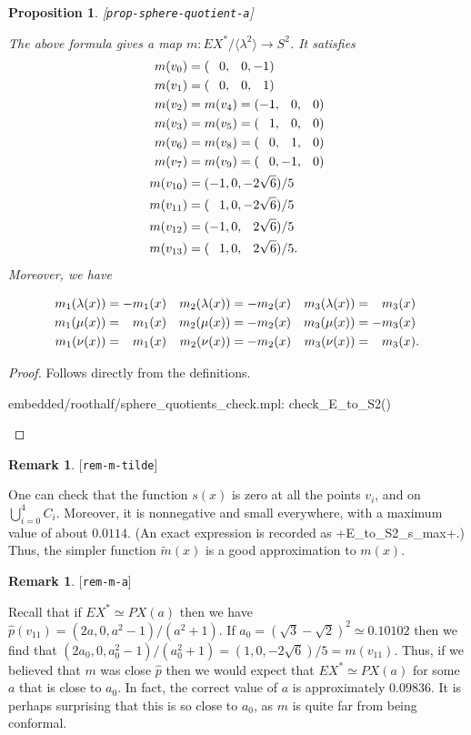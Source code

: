 \documentclass[reqno]{amsart}
\newcommand{\lbl}[1]{\label{#1}\textup{[\texttt{#1}]}\par}
\newcommand{\lbl}{\label}
\newcommand{\lm}        {\lambda}
\newcommand{\ip}[1]     {\langle #1\rangle}
\newcommand{\mt}	{\widetilde{m}}
\newcommand{\hp}        {\widehat{p}}
\newcommand{\pp}        {\hphantom{+}}
\renewcommand{\:}{\colon}
\newtheorem{proposition}[theorem]{Proposition}
\theoremstyle{definition}
\newtheorem{remark}[theorem]{Remark}
\begin{document}
\begin{proposition}\lbl{prop-sphere-quotient-a}
 The above formula gives a map $m\:EX^*/\ip{\lm^2}\to S^2$.  It
 satisfies
 \begin{align*}
  m(v_0) &= (\pp 0,\pp 0,   -1) \\
  m(v_1) &= (\pp 0,\pp 0,\pp 1) \\
  m(v_2) &= m(v_4) = (  - 1,\pp 0,\pp 0) \\
  m(v_3) &= m(v_5) = (\pp 1,\pp 0,\pp 0) \\
  m(v_6) &= m(v_8) = (\pp 0,\pp 1,\pp 0) \\
  m(v_7) &= m(v_9) = (\pp 0,  - 1,\pp 0) \\
  m(v_{10}) &= (  - 1,0,   -2\sqrt{6})/5 \\
  m(v_{11}) &= (\pp 1,0,   -2\sqrt{6})/5 \\
  m(v_{12}) &= (  - 1,0,\pp 2\sqrt{6})/5 \\
  m(v_{13}) &= (\pp 1,0,\pp 2\sqrt{6})/5.
 \end{align*}
 Moreover, we have

 \begin{align*}
  m_1(\lm(x)) &=    -m_1(x) & m_2(\lm(x)) &=   -m_2(x) & m_3(\lm(x)) &= \pp m_3(x) \\
  m_1(\mu(x)) &= \pp m_1(x) & m_2(\mu(x)) &=   -m_2(x) & m_3(\mu(x)) &=    -m_3(x) \\
  m_1(\nu(x)) &= \pp m_1(x) & m_2(\nu(x)) &=   -m_2(x) & m_3(\nu(x)) &= \pp m_3(x).
 \end{align*}
\end{proposition}
\begin{proof}
 Follows directly from the definitions.
 \begin{checks}
  embedded/roothalf/sphere_quotients_check.mpl: check_E_to_S2()
 \end{checks}
\end{proof}

\begin{remark}\lbl{rem-m-tilde}
 One can check that the function $s(x)$ is zero at all the points
 $v_i$, and on $\bigcup_{i=0}^4C_i$.  Moreover, it is nonnegative and
 small everywhere, with a maximum value of about $0.0114$.  (An exact
 expression is recorded as \mcode+E_to_S2_s_max+.)  Thus, the simpler
 function $\mt(x)$ is a good approximation to $m(x)$.
\end{remark}

\begin{remark}\lbl{rem-m-a}
 Recall that if $EX^*\simeq PX(a)$ then we have
 $\hp(v_{11})=(2a,0,a^2-1)/(a^2+1)$.  If
 $a_0=(\sqrt{3}-\sqrt{2})^2\simeq 0.10102$ then we find that
 $(2a_0,0,a_0^2-1)/(a_0^2+1)=(1,0,-2\sqrt{6})/5=m(v_{11})$.  Thus, if
 we believed that $m$ was close $\hp$ then we would expect that
 $EX^*\simeq PX(a)$ for some $a$ that is close to $a_0$.  In fact, the
 correct value of $a$ is approximately $0.09836$.  It is perhaps
 surprising that this is so close to $a_0$, as $m$ is quite far from
 being conformal.
\end{remark}
\end{document}
